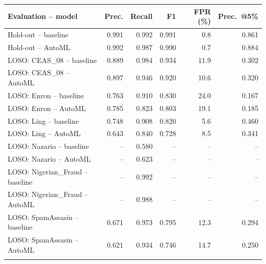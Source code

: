 \begin{tabular}{lrrrrr}
\toprule
Evaluation -- model & Prec. & Recall & F1 & FPR (\%) & Prec.\ @5\% \\
\midrule
Hold-out -- baseline & 0.991 & 0.992 & 0.991 & 0.8 & 0.861 \\
Hold-out -- AutoML & 0.992 & 0.987 & 0.990 & 0.7 & 0.884 \\ \addlinespace
LOSO: CEAS\_08 -- baseline & 0.889 & 0.984 & 0.934 & 11.9 & 0.302 \\
LOSO: CEAS\_08 -- AutoML & 0.897 & 0.946 & 0.920 & 10.6 & 0.320 \\ \addlinespace
LOSO: Enron -- baseline & 0.763 & 0.910 & 0.830 & 24.0 & 0.167 \\
LOSO: Enron -- AutoML & 0.785 & 0.823 & 0.803 & 19.1 & 0.185 \\ \addlinespace
LOSO: Ling -- baseline & 0.748 & 0.908 & 0.820 & 5.6 & 0.460 \\
LOSO: Ling -- AutoML & 0.643 & 0.840 & 0.728 & 8.5 & 0.341 \\ \addlinespace
LOSO: Nazario -- baseline & -- & 0.580 & -- & -- & -- \\
LOSO: Nazario -- AutoML & -- & 0.623 & -- & -- & -- \\ \addlinespace
LOSO: Nigerian\_Fraud -- baseline & -- & 0.992 & -- & -- & -- \\
LOSO: Nigerian\_Fraud -- AutoML & -- & 0.988 & -- & -- & -- \\ \addlinespace
LOSO: SpamAssasin -- baseline & 0.671 & 0.973 & 0.795 & 12.3 & 0.294 \\
LOSO: SpamAssasin -- AutoML & 0.621 & 0.934 & 0.746 & 14.7 & 0.250 \\ \addlinespace
\bottomrule
\end{tabular}